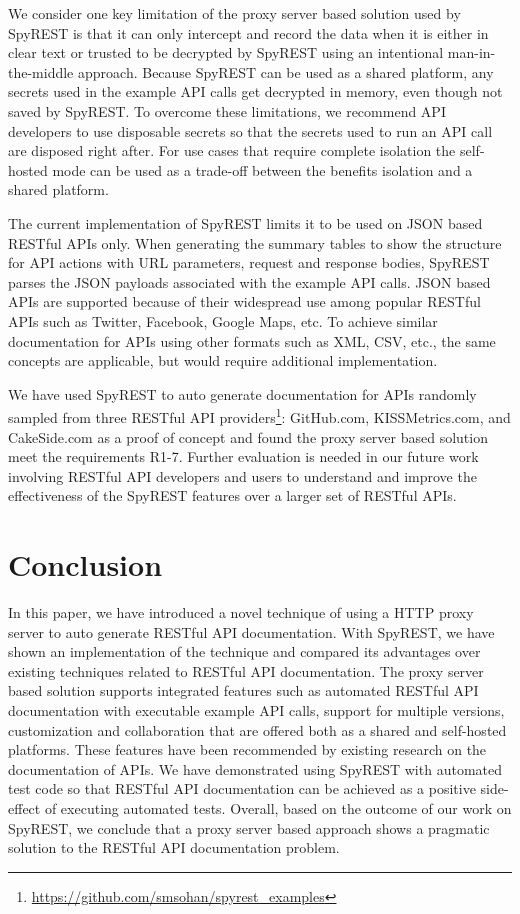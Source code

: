 \documentclass[conference]{IEEEtran}
\begin{document}
We consider one key limitation of the proxy server based solution used by SpyREST is that it can only intercept and record the data when it is either in clear text or trusted to be decrypted by SpyREST using an intentional man-in-the-middle approach. Because SpyREST can be used as a shared platform, any secrets used in the example API calls get decrypted in memory, even though not saved by SpyREST. To overcome these limitations, we recommend API developers to use disposable secrets so that the secrets used to run an API call are disposed right after. For use cases that require complete isolation the self-hosted mode can be used as a trade-off between the benefits isolation and a shared platform.

The current implementation of SpyREST limits it to be used on JSON based RESTful APIs only. When generating the summary tables to show the structure for API actions with URL parameters, request and response bodies, SpyREST parses the JSON payloads associated with the example API calls. JSON based APIs are supported because of their widespread use among popular RESTful APIs such as Twitter, Facebook, Google Maps, etc. To achieve similar documentation for APIs using other formats such as XML, CSV, etc., the same concepts are applicable, but would require additional implementation.

We have used SpyREST to auto generate documentation for APIs randomly sampled from three RESTful API providers\footnote{\url{https://github.com/smsohan/spyrest_examples}}: GitHub.com, KISSMetrics.com, and CakeSide.com as a proof of concept and found the proxy server based solution meet the requirements R1-7. Further evaluation is needed in our future work involving RESTful API developers and users to understand and improve the effectiveness of the SpyREST features over a larger set of RESTful APIs.

\section{Conclusion}
In this paper, we have introduced a novel technique of using a HTTP proxy server to auto generate RESTful API documentation. With SpyREST, we have shown an implementation of the technique and compared its advantages over existing techniques related to RESTful API documentation. The proxy server based solution supports integrated features such as automated RESTful API documentation with executable example API calls, support for multiple versions, customization and collaboration that are offered both as a shared and self-hosted platforms. These features have been recommended by existing research on the documentation of APIs. We have demonstrated using SpyREST with automated test code so that RESTful API documentation can be achieved as a positive side-effect of executing automated tests. Overall, based on the outcome of our work on SpyREST, we conclude that a proxy server based approach shows a pragmatic solution to the RESTful API documentation problem.
\end{document}

